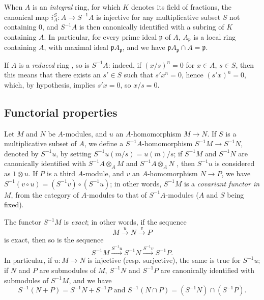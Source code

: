 \begin{env}[1.2.7]
\label{0.1.2.7}
When $A$ is an \emph{integral} ring, for which $K$ denotes its field of
fractions, the canonical map $i_A^S:A\to S^{-1}A$ is injective for any
multiplicative subset $S$ not containing $0$, and $S^{-1}A$ is then canonically identified
with a subring of $K$ containing $A$. In particular, for every prime
ideal $\mathfrak{p}$ of $A$, $A_\mathfrak{p}$ is a local ring containing $A$,
with maximal ideal $\mathfrak{p}A_\mathfrak{p}$, and we have
$\mathfrak{p}A_\mathfrak{p}\cap A=\mathfrak{p}$.
\end{env}

\begin{env}[1.2.8]
\label{0.1.2.8}
If $A$ is a \emph{reduced} ring , so is $S^{-1}A$: indeed, if
$(x/s)^n=0$ for $x\in A$, $s\in S$, then this means that there exists an
$s'\in S$ such that $s' x^n=0$, hence $(s' x)^n=0$, which, by hypothesis, implies
$s' x=0$, so $x/s=0$.
\end{env}

\subsection{Functorial properties}
\label{subsection:0.1.3}

\begin{env}[1.3.1]
\label{0.1.3.1}
Let $M$ and $N$ be $A$-modules, and $u$ an $A$-homomorphism $M\to N$. If $S$ is a
multiplicative subset of $A$, we define a $S^{-1}A$-homomorphism
$S^{-1}M\to S^{-1}N$, denoted by $S^{-1}u$, by setting $S^{-1}u(m/s)=u(m)/s$; if
$S^{-1}M$ and $S^{-1}N$ are canonically identified with $S^{-1}A\otimes_A M$ and
$S^{-1}A\otimes_A N$ , then $S^{-1}u$ is considered as $1\otimes u$.
If $P$ is a third $A$-module, and $v$ an $A$-homomorphism $N\to P$, we have
$S^{-1}(v\circ u)=(S^{-1}v)\circ(S^{-1}u)$; in other words, $S^{-1}M$ is a
\emph{covariant functor in $M$}, from the category of $A$-modules to that of
$S^{-1}A$-modules ($A$ and $S$ being fixed).
\end{env}

\begin{env}[1.3.2]
\label{0.1.3.2}
The functor $S^{-1}M$ is \emph{exact}; in other words, if the sequence
\[
  M\xrightarrow{u}N\xrightarrow{v}P
\]
is exact, then so is the sequence
\[
  S^{-1}M\xrightarrow{S^{-1}u}S^{-1}N\xrightarrow{S^{-1}v}S^{-1}P.
\]
In particular, if $u:M\to N$ is injective (resp. surjective), the same is true
for $S^{-1}u$;
if $N$ and $P$ are submodules of $M$, $S^{-1}N$ and $S^{-1}P$ are canonically identified with submodules of $S^{-1}M$, and we have
\[
  S^{-1}(N+P)=S^{-1}N+S^{-1}P\text{ and }S^{-1}(N\cap P)=(S^{-1}N)\cap(S^{-1}P).
\]
\end{env}

